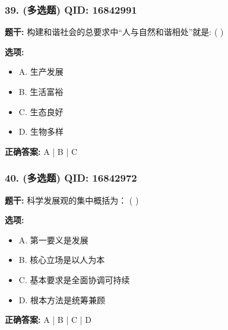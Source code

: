 \documentclass[12pt,UTF8]{ctexart}
\begin{document}
\vspace{0.3em}\hrulefill\vspace{0.7em}

\subsubsection*{39. (多选题) \small QID: 16842991}

\textbf{题干:}
构建和谐社会的总要求中“人与自然和谐相处”就是: ( )

\textbf{选项:}
\begin{itemize}[leftmargin=*]

  \item A. 生产发展

  \item B. 生活富裕

  \item C. 生态良好

  \item D. 生物多样

\end{itemize}

\textbf{正确答案:}
A | B | C

\vspace{0.3em}\hrulefill\vspace{0.7em}

\subsubsection*{40. (多选题) \small QID: 16842972}

\textbf{题干:}
科学发展观的集中概括为： ( )

\textbf{选项:}
\begin{itemize}[leftmargin=*]

  \item A. 第一要义是发展

  \item B. 核心立场是以人为本

  \item C. 基本要求是全面协调可持续

  \item D. 根本方法是统筹兼顾

\end{itemize}

\textbf{正确答案:}
A | B | C | D

\vspace{0.3em}\hrulefill\vspace{0.7em}
\end{document}
